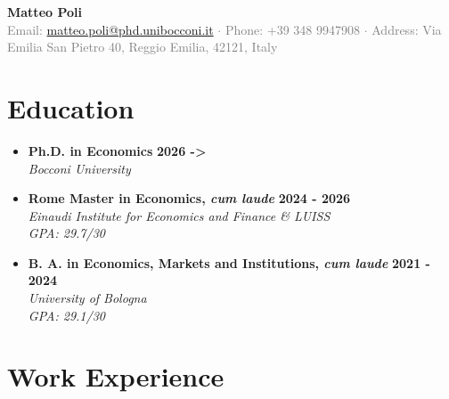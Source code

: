 \documentclass[11pt,a4paper]{article}
\newcommand{\cventry}[5]{%
    \item \textbf{#1} \hfill \textbf{#2} \\
    \textit{#3} \hfill #4 \\
    #5 %
}
\begin{document}
\begin{center}
    {\LARGE \textbf{Matteo Poli}} \\[0.5em]
    \textcolor{gray}{
        Email: \href{mailto:matteo.poli@studenti.luiss.it}{matteo.poli@phd.unibocconi.it} $\cdot$ 
        Phone: +39 348 9947908 $\cdot$ 
        Address: Via Emilia San Pietro 40, Reggio Emilia, 42121, Italy
    }
\end{center}

\vspace{0.5em}

\section{Education}

\begin{itemize}[leftmargin=0em, itemsep=0.5em]
	\cventry{Ph.D. in Economics}{2026 ->   \texttt{}\texttt{\char32}\texttt{\char32} }{Bocconi University}{}{}
		

    \cventry{Rome Master in Economics, \textit{cum laude}}{2024 - 2026}{Einaudi Institute for Economics and Finance \& LUISS}{}{
        \textit{GPA: 29.7/30} %
        
    } %
    
    \cventry{B. A. in Economics, Markets and Institutions, \textit{cum laude}}{2021 - 2024}{University of Bologna}{}{
        \textit{GPA: 29.1/30} %
    }
\end{itemize}

\section{Work Experience}
\end{document}
